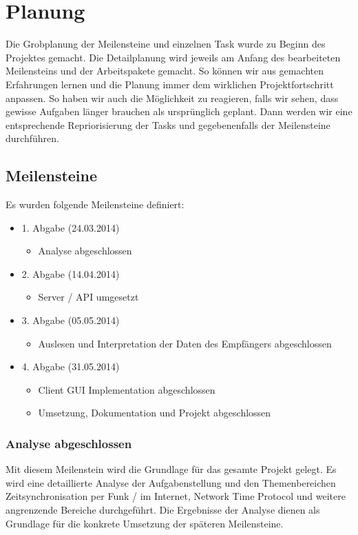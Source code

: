 \section{Planung}

Die Grobplanung der Meilensteine und einzelnen Task wurde zu Beginn des Projektes gemacht. Die Detailplanung wird jeweils am Anfang des bearbeiteten Meilensteins und der Arbeitspakete gemacht. So können wir aus gemachten Erfahrungen lernen und die Planung immer dem wirklichen Projektfortschritt anpassen. So haben wir auch die Möglichkeit zu reagieren, falls wir sehen, dass gewisse Aufgaben länger brauchen als ursprünglich geplant. Dann werden wir eine entsprechende Repriorisierung der Tasks und gegebenenfalls der Meilensteine durchführen.

\subsection{Meilensteine}
Es wurden folgende Meilensteine definiert:

\begin{itemize}
\item 1. Abgabe (24.03.2014)
	\begin{itemize}
	\item Analyse abgeschlossen
	\end{itemize}
\item 2. Abgabe (14.04.2014)
	\begin{itemize}
	\item Server / API umgesetzt
	\end{itemize}
\item 3. Abgabe (05.05.2014)
	\begin{itemize}
	\item Auslesen und Interpretation der Daten des Empfängers abgeschlossen
	\end{itemize}
\item 4. Abgabe (31.05.2014)
	\begin{itemize}
	\item Client GUI Implementation abgeschlossen
	\item Umsetzung, Dokumentation und Projekt abgeschlossen
	\end{itemize}
\end{itemize}

\subsubsection{Analyse abgeschlossen}
Mit diesem Meilenstein wird die Grundlage für das gesamte Projekt gelegt. Es wird eine detaillierte Analyse der Aufgabenstellung und den Themenbereichen Zeitsynchronisation per Funk / im Internet, Network Time Protocol und weitere angrenzende Bereiche durchgeführt. Die Ergebnisse der Analyse dienen als Grundlage für die konkrete Umsetzung der späteren Meilensteine.


